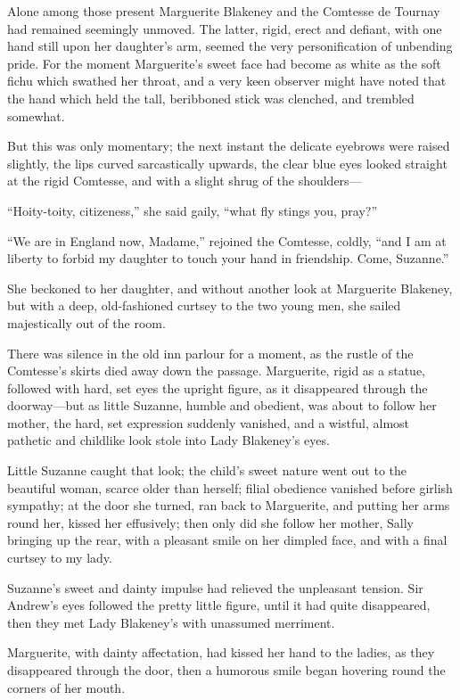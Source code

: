 \documentclass[paper=5.5in:8.5in,BCOR=7mm,twoside,DIV=calc,12pt,usegeometry,chapterprefix,endperiod,headings=big]{scrbook}
\begin{document}
Alone among those present Marguerite Blakeney and the Comtesse de Tournay had remained seemingly unmoved. The latter, rigid, erect and defiant, with one hand still upon her daughter's arm, seemed the very personification of unbending pride. For the moment Marguerite's sweet face had become as white as the soft fichu which swathed her throat, and a very keen observer might have noted that the hand which held the tall, beribboned stick was clenched, and trembled somewhat.

But this was only momentary; the next instant the delicate eyebrows were raised slightly, the lips curved sarcastically upwards, the clear blue eyes looked straight at the rigid Comtesse, and with a slight shrug of the shoulders---

\enquote{Hoity-toity, citizeness,} she said gaily, \enquote{what fly stings you, pray?}

\enquote{We are in England now, Madame,} rejoined the Comtesse, coldly, \enquote{and I am at liberty to forbid my daughter to touch your hand in friendship. Come, Suzanne.}

She beckoned to her daughter, and without another look at Marguerite Blakeney, but with a deep, old-fashioned curtsey to the two young men, she sailed majestically out of the room.

There was silence in the old inn parlour for a moment, as the rustle of the Comtesse's skirts died away down the passage. Marguerite, rigid as a statue, followed with hard, set eyes the upright figure, as it disappeared through the doorway---but as little Suzanne, humble and obedient, was about to follow her mother, the hard, set expression suddenly vanished, and a wistful, almost pathetic and childlike look stole into Lady Blakeney's eyes.

Little Suzanne caught that look; the child's sweet nature went out to the beautiful woman, scarce older than herself; filial obedience vanished before girlish sympathy; at the door she turned, ran back to Marguerite, and putting her arms round her, kissed her effusively; then only did she follow her mother, Sally bringing up the rear, with a pleasant smile on her dimpled face, and with a final curtsey to my lady.

Suzanne's sweet and dainty impulse had relieved the unpleasant tension. Sir Andrew's eyes followed the pretty little figure, until it had quite disappeared, then they met Lady Blakeney's with unassumed merriment.

Marguerite, with dainty affectation, had kissed her hand to the ladies, as they disappeared through the door, then a humorous smile began hovering round the corners of her mouth.
\end{document}
